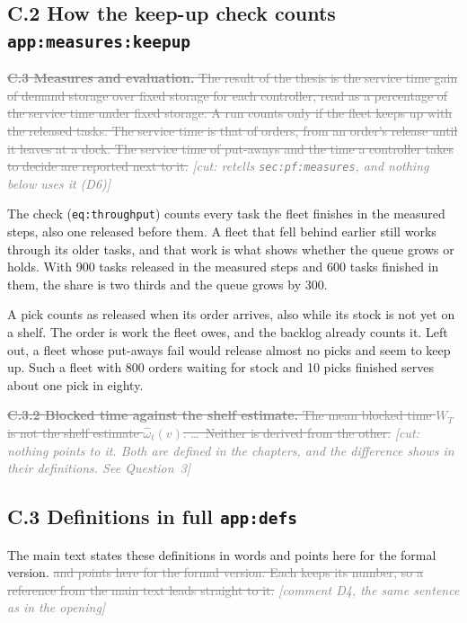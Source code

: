 \documentclass[11pt,a4paper]{article}
\newcommand{\new}[1]{\textcolor{newc}{#1}}
\newcommand{\old}[1]{\textcolor{gray}{\sout{#1}}}
\newcommand{\lref}[1]{{\small\texttt{#1}}}
\newcommand{\cmt}[1]{{\small\textcolor{gray}{\emph{[comment #1]}}}}
\newcommand{\cut}[1]{{\small\textcolor{gray}{\emph{[cut: #1]}}}}
\begin{document}
\subsection*{C.2 \quad How the keep-up check counts \hfill\lref{app:measures:keepup}}

\old{\textbf{C.3 Measures and evaluation.} The result of the thesis is the
service time gain of demand storage over fixed storage for each controller,
read as a percentage of the service time under fixed storage. A run counts
only if the fleet keeps up with the released tasks. The service time is that
of orders, from an order's release until it leaves at a dock. The service
time of put-aways and the time a controller takes to decide are reported next
to it.} \cut{retells \lref{sec:pf:measures}, and nothing below uses it (D6)}

The check (\lref{eq:throughput}) counts every task the fleet finishes in the
measured steps, also one released before them. A fleet that fell behind
earlier still works through its older tasks, and that work is what shows
whether the queue grows or holds. With 900 tasks released in the measured
steps and 600 tasks finished in them, the share is two thirds and the queue
grows by 300.

A pick counts as released when its order arrives, also while its stock is
not yet on a shelf. The order is work the fleet owes, and the backlog already
counts it. Left out, a fleet whose put-aways fail would release almost no
picks and seem to keep up. Such a fleet with 800 orders waiting for stock and
10 picks finished serves about one pick in eighty.

\old{\textbf{C.3.2 Blocked time against the shelf estimate.} The mean blocked
time $W_T$ is not the shelf estimate $\hat\omega_t(v)$. \ldots\ Neither is
derived from the other.} \cut{nothing points to it. Both are defined in the
chapters, and the difference shows in their definitions. See Question~3}

\subsection*{C.3 \quad Definitions in full \hfill\lref{app:defs}}

The main text states these definitions in words \new{and points here for the
formal version.} \old{and points here for the formal version. Each keeps its
number, so a reference from the main text leads straight to it.}
\hfill\cmt{D4, the same sentence as in the opening}
\end{document}
